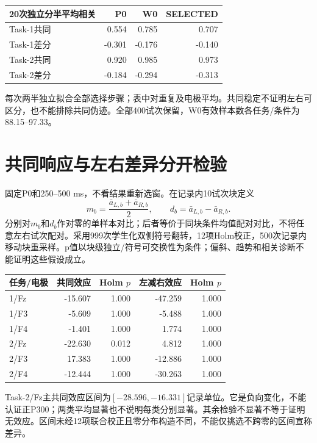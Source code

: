 \documentclass[UTF8,a4paper,11pt,fontset=fandol]{ctexart}
\begin{document}
\begin{center}
\begin{tabular}{lrrr}
\toprule
20次独立分半平均相关 & P0 & W0 & SELECTED\\
\midrule
Task-1共同 & 0.554 & 0.785 & 0.707\\
Task-1差分 & -0.301 & -0.176 & -0.140\\
Task-2共同 & 0.920 & 0.985 & 0.973\\
Task-2差分 & -0.184 & -0.294 & -0.313\\
\bottomrule
\end{tabular}
\end{center}
每次两半独立拟合全部选择步骤；表中对重复及电极平均。共同稳定不证明左右可区分，也不能排除共同伪迹。全部400试次保留，W0有效样本数各任务/条件为88.15--97.33。

\section{共同响应与左右差异分开检验}
固定P0和250--500 ms，不看结果重新选窗。在记录内10试次块定义
\[
m_b=\frac{\bar a_{L,b}+\bar a_{R,b}}{2},\qquad d_b=\bar a_{L,b}-\bar a_{R,b}.
\]
分别对$m_b$和$d_b$作对零的单样本对比；后者等价于同块条件均值配对对比，不将任意左右试次配对。采用999次学生化双侧符号翻转，12项Holm校正，500次记录内移动块重采样。p值以块级独立/符号可交换性为条件；偏斜、趋势和相关诊断不能证明这些假设成立。

\begin{center}
\begin{tabular}{lrrrr}
\toprule
任务/电极 & 共同效应 & Holm $p$ & 左减右效应 & Holm $p$\\
\midrule
1/Fz & -15.607 & 1.000 & -47.259 & 1.000\\
1/F3 & -5.609 & 1.000 & -5.488 & 1.000\\
1/F4 & -1.401 & 1.000 & 1.774 & 1.000\\
2/Fz & -22.630 & 0.012 & 4.812 & 1.000\\
2/F3 & 17.383 & 1.000 & -12.886 & 1.000\\
2/F4 & -12.444 & 1.000 & -30.263 & 1.000\\
\bottomrule
\end{tabular}
\end{center}
Task-2/Fz主共同效应区间为$[-28.596,-16.331]$记录单位。它是负向变化，不能认证正P300；两类平均显著也不说明每类分别显著。其余检验不显著不等于证明无效应。区间未经12项联合校正且零分布构造不同，不能仅挑选不跨零的区间宣称差异。
\end{document}
